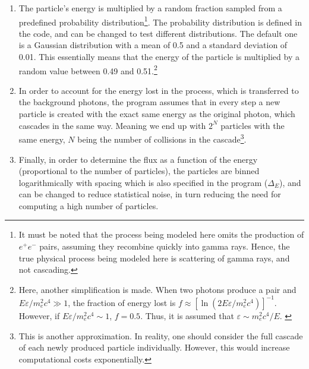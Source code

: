 \begin{enumerate}
\item The particle's energy is multiplied by a random fraction sampled from a predefined probability distribution\footnote{It must be noted that the process being modeled here omits the production of $e^+e^-$ pairs, assuming they recombine quickly into  gamma rays. Hence, the true physical process being modeled here is scattering of gamma rays, and not cascading.}. The probability distribution is defined in the code, and can be changed to test different distributions. The default one is a Gaussian distribution with a mean of 0.5 and a standard deviation of 0.01. This essentially means that the energy of the particle is multiplied by a random value between 0.49 and 0.51.\footnote{Here, another simplification is made. When two photons produce a pair and $E\varepsilon/m_e^2c^4\gg1$, the fraction of energy lost is $f\approx [\ln(2E\varepsilon/m_e^2c^4)]^{-1}$. However, if $E\varepsilon/m_e^2c^4\sim 1$, $f=0.5$. Thus, it is assumed that $\varepsilon \sim m_e^2c^4/E$. \citep{energyfraction}}
\item In order to account for the energy lost in the process, which is transferred to the background photons, the program assumes that in every step a new particle is created with the exact same energy as the original photon, which cascades in the same way. Meaning we end up with $2^N$ particles with the same energy, $N$ being the number of collisions in the cascade\footnote{This is another approximation. In reality, one should consider the full cascade of each newly produced particle individually. However, this would increase computational costs exponentially.}.
\item Finally, in order to determine the flux as a function of the energy (proportional to the number of particles), the particles are binned logarithmically with spacing which is also specified in the program ($\Delta_E$), and can be changed to reduce statistical noise, in turn reducing the need for computing a high number of particles.
 
\end{enumerate}






